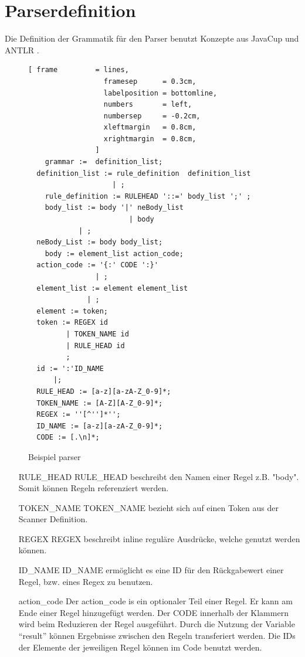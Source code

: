 \section{Parserdefinition}
Die Definition der Grammatik für den Parser benutzt Konzepte aus JavaCup und ANTLR .
\begin{figure}[!ht]
\begin{Verbatim}[ frame         = lines, 
                  framesep      = 0.3cm, 
                  labelposition = bottomline,
                  numbers       = left,
                  numbersep     = -0.2cm,
                  xleftmargin   = 0.8cm,
                  xrightmargin  = 0.8cm,
                ]
	grammar :=  definition_list;
  definition_list := rule_definition  definition_list
                    | ;
	rule_definition := RULEHEAD '::=' body_list ';' ;
	body_list := body '|' neBody_list
						| body
            | ;
  neBody_List := body body_list;
	body := element_list action_code;
  action_code := '{:' CODE ':}'
                | ;
  element_list := element element_list
              | ;
  element := token;
  token := REGEX id
         | TOKEN_NAME id
         | RULE_HEAD id
         ;
  id := ':'ID_NAME
      |;
  RULE_HEAD := [a-z][a-zA-Z_0-9]*;
  TOKEN_NAME := [A-Z][A-Z_0-9]*;
  REGEX := ''[^'']*'';
  ID_NAME := [a-z][a-zA-Z_0-9]*;
  CODE := [.\n]*;
\end{Verbatim}
\caption{Beispiel parser}
\label{fig:example_grammer}
\end{figure}
\begin{itemize}
	\item[RULE\_HEAD]  RULE\_HEAD beschreibt den Namen einer Regel z.B. "body". Somit können Regeln referenziert werden. 
	\item[TOKEN\_NAME] TOKEN\_NAME bezieht sich auf einen Token aus der Scanner Definition.
	\item[REGEX] REGEX beschreibt inline reguläre Ausdrücke, welche genutzt werden können. 
	\item[ID\_NAME] ID\_NAME ermöglicht es eine ID für den Rückgabewert einer Regel, bzw. eines Regex zu benutzen.
	\item[action\_code] Der action\_code is ein optionaler Teil einer Regel. Er kann am Ende einer Regel hinzugefügt werden. Der CODE innerhalb der Klammern  wird beim Reduzieren der Regel ausgeführt. Durch die Nutzung der Variable "`result"' können Ergebnisse zwischen den Regeln transferiert werden. Die IDs der Elemente der jeweiligen Regel können im Code benutzt werden.
\end{itemize}
\newpage
